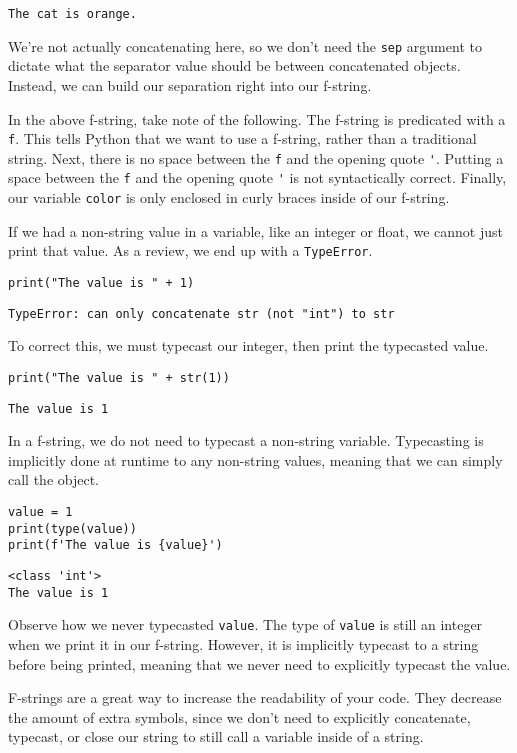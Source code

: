 \begin{lstlisting}[style=none]
The cat is orange.
\end{lstlisting}
We're not actually concatenating here, so we don't need the \verb|sep| argument to dictate what the separator value should be between concatenated objects. Instead, we can build our separation right into our f-string.\par
In the above f-string, take note of the following. The f-string is predicated with a \verb|f|. This tells Python that we want to use a f-string, rather than a traditional string. Next, there is no space between the \verb|f| and the opening quote \verb|'|. Putting a space between the \verb|f| and the opening quote \verb|'| is not syntactically correct. Finally, our variable \verb|color| is only enclosed in curly braces inside of our f-string.\par
If we had a non-string value in a variable, like an integer or float, we cannot just print that value. As a review, we end up with a \verb|TypeError|.
\begin{lstlisting}[style=pippython]
print("The value is " + 1)
\end{lstlisting}
\begin{lstlisting}[style=none]
TypeError: can only concatenate str (not "int") to str
\end{lstlisting}
To correct this, we must typecast our integer, then print the typecasted value.
\begin{lstlisting}[style=pippython]
print("The value is " + str(1))
\end{lstlisting}
\begin{lstlisting}[style=none]
The value is 1
\end{lstlisting}
In a f-string, we do not need to typecast a non-string variable. Typecasting is implicitly done at runtime to any non-string values, meaning that we can simply call the object.\par
\begin{lstlisting}[style=pippython]
value = 1
print(type(value))
print(f'The value is {value}')
\end{lstlisting}
\begin{lstlisting}[style=none]
<class 'int'>
The value is 1
\end{lstlisting}
Observe how we never typecasted \verb|value|. The type of \verb|value| is still an integer when we print it in our f-string. However, it is implicitly typecast to a string before being printed, meaning that we never need to explicitly typecast the value.\par
F-strings are a great way to increase the readability of your code. They decrease the amount of extra symbols, since we don't need to explicitly concatenate, typecast, or close our string to still call a variable inside of a string.

